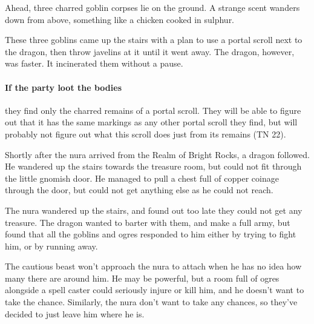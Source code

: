 \begin{multicols}{2}


\begin{boxtext}

	Ahead, three charred goblin corpses lie on the ground.
	A strange scent wanders down from above, something like a chicken cooked in sulphur.

\end{boxtext}

\begin{exampletext}

	These three goblins came up the stairs with a plan to use a portal scroll next to the dragon, then throw javelins at it until it went away.
	The dragon, however, was faster.
	It incinerated them without a pause.

\end{exampletext}

\paragraph{If the party loot the bodies}
they find only the charred remains of a portal scroll.
They will be able to figure out that it has the same markings as any other portal scroll they find, but will probably not figure out what this scroll does just from its remains (TN 22).


\begin{exampletext}

	Shortly after the nura arrived from the Realm of Bright Rocks, a dragon followed.
	He wandered up the stairs towards the treasure room, but could not fit through the little gnomish door.
	He managed to pull a chest full of copper coinage through the door, but could not get anything else as he could not reach.

	The nura wandered up the stairs, and found out too late they could not get any treasure.
	The dragon wanted to barter with them, and make a full army, but found that all the goblins and ogres responded to him either by trying to fight him, or by running away.

	The cautious beast won't approach the nura to attach when he has no idea how many there are around him.
	He may be powerful, but a room full of ogres alongside a spell caster could seriously injure or kill him, and he doesn't want to take the chance.
	Similarly, the nura don't want to take any chances, so they've decided to just leave him where he is.


\end{exampletext}
\end{multicols}
